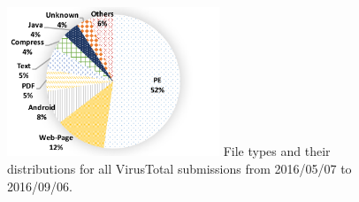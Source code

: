 \begin{figure}[t!]
\begin{center}
\includegraphics[width=2.5in]{figure/type}
{
File types and their distributions for all VirusTotal submissions from 2016/05/07 to 2016/09/06. 
}
\end{center}
\end{figure}
